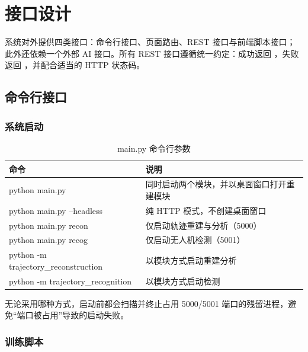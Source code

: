 \section{接口设计}

系统对外提供四类接口：命令行接口、页面路由、REST 接口与前端脚本接口；此外还依赖一个外部 AI 接口。所有 REST 接口遵循统一约定：成功返回 ，失败返回 ，并配合适当的 HTTP 状态码。

\subsection{命令行接口}

\subsubsection{系统启动}

\begin{table}[H]
\centering
\caption{main.py 命令行参数}
\label{tab:cli}
\small
\begin{tabularx}{\linewidth}{@{}>{\raggedright\ttfamily\scriptsize}p{5.4cm}>{\raggedright\arraybackslash}X@{}}
\toprule
命令 & 说明 \\
\midrule
python main.py & 同时启动两个模块，并以桌面窗口打开重建模块 \\
python main.py --headless & 纯 HTTP 模式，不创建桌面窗口 \\
python main.py recon & 仅启动轨迹重建与分析（5000） \\
python main.py recog & 仅启动无人机检测（5001） \\
python -m trajectory\_reconstruction & 以模块方式启动重建分析 \\
python -m trajectory\_recognition & 以模块方式启动检测 \\
\bottomrule
\end{tabularx}
\end{table}

无论采用哪种方式，启动前都会扫描并终止占用 5000/5001 端口的残留进程，避免“端口被占用”导致的启动失败。

\subsubsection{训练脚本}

